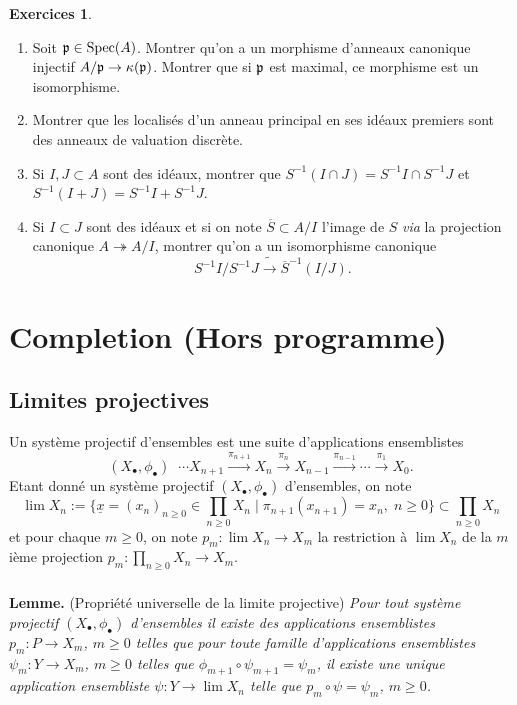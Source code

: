 \documentclass[a4paper, oneside, 12pt]{book}
\theoremstyle{theoremeStyle} %
\theoremstyle{definition} %
\newtheorem{exercices}[theoreme]{Exercices}
\DeclareMathOperator{\Spec}{Spec}
\begin{document}
		\begin{exercices}
	\begin{enumerate}
	\item Soit $\frak{p}\in \Spec(A)$. Montrer qu'on a un morphisme d'anneaux canonique injectif $A/\frak{p}\rightarrow \kappa(\frak{p})$. Montrer que si $\frak{p}$ est maximal, ce morphisme est un isomorphisme.
	\item Montrer que les localisés d'un anneau principal en ses idéaux premiers sont des anneaux de valuation discrète.
	\item Si $I,J\subset A$ sont des idéaux, montrer que  $S^{-1}(I\cap J)=S^{-1}I\cap S^{-1}J$ et $S^{-1}(I+J)=S^{-1}I+S^{-1}J$.
	\item  Si $I\subset J$ sont des idéaux et si on note $\overline{S}\subset A/I$ l'image de $S$ \textit{via} la projection canonique $A\twoheadrightarrow A/I$, montrer qu'on a un isomorphisme canonique $$S^{-1}I/S^{-1}J\tilde{\rightarrow}\overline{S}^{-1}(I/J).$$
	\end{enumerate}
		\end{exercices}
 \chapter{Completion (Hors programme)}
 \section{Limites projectives}
 Un système projectif  d'ensembles est une suite d'applications ensemblistes $$(X_\bullet,\phi_\bullet)\;\; \cdots X_{n+1}\stackrel{\pi_{n+1}}{\rightarrow} X_n\stackrel{\pi_{n }}{\rightarrow}X_{n-1}\stackrel{\pi_{n-1}}{\rightarrow}\cdots \stackrel{\pi_{1}}{\rightarrow}X_0.$$
  Etant donné un système projectif $(X_\bullet,\phi_\bullet)$ d'ensembles, on note
  $$\lim X_n :=\lbrace \underline{x}=(x_n)_{n\geq 0}\in\prod_{n\geq 0}X_n\; |\; \pi_{n+1}(x_{n+1})=x_n,\; n\geq 0\rbrace\subset \prod_{n\geq 0}X_n$$
  et pour chaque $m\geq 0$, on note $p_m:\lim X_n\rightarrow X_m$ la  restriction à $\lim X_n$ de la $m$ième projection $p_m:\prod_{n\geq 0}X_n\rightarrow X_m$.

 \subsection{}\label{LimProj}\textbf{Lemme.} (Propriété universelle de la limite projective) \textit{Pour tout système projectif $(X_\bullet,\phi_\bullet)$ d'ensembles  il existe des applications ensemblistes $p_m:P\rightarrow X_m$, $m\geq 0$ telles que pour toute famille  d'applications ensemblistes $\psi_m:Y\rightarrow X_m$, $m\geq 0$ telles que $\phi_{m+1}\circ \psi_{m+1}=\psi_m$, il existe une unique application ensembliste $\psi:Y\rightarrow \lim X_n$ telle que $p_m\circ \psi=\psi_m$, $m\geq 0$.}\\
\end{document}
